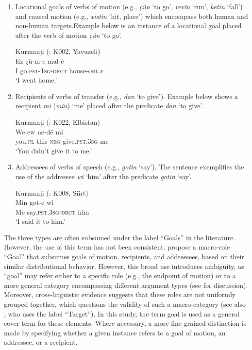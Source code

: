 \largerpage
\begin{enumerate}
    \item Locational goals of verbs of motion (e.g., \textit{çûn} ‘to go’, \textit{revîn} ‘run’, \textit{ketin} ‘fall’) and caused motion (e.g., \textit{xistin} ‘hit, place’) which encompass both human and non-human targets.\newpage Example  below is an instance of a locational goal placed after the verb of motion \textit{çûn} ‘to go’.

\ea%
  \label{ex:key:9} Kurmanji (\citealt{Matras2016}: K002, Yavuzeli)\\
\gll Ez  çû-m-e      mal-ê \\
I     go.\textsc{pst-1sg-drct}  house-\textsc{obl.f}\\
\glt ‘I went home.’
  \z

    \item Recipients of verbs of transfer (e.g., \textit{dan} ‘to give’). Example  below shows a recipient \textit{mi} (\textit{min}) ‘me’ placed after the predicate \textit{dan} ‘to give’.

\ea%
  \label{ex:key:10} Kurmanji (\citealt{Matras2016}: K022, Elbistan)\\
\gll We  ew  ne-dê      mi \\
you\textsc{.pl}  this  \textsc{neg}-give.\textsc{pst.3sg}  me\\
\glt ‘You didn’t give it to me.’
  \z

\item Addressees of verbs of speech (e.g., \textit{gotin} ‘say’). The sentence  exemplifies the use of the addressee \textit{wî} ‘him’ after the predicate \textit{gotin} ‘say’.

\ea%
  \label{ex:key:11} Kurmanji (\citealt{Matras2016}: K008, Siirt)\\
\gll Min  got-e      wî \\
Me  say.\textsc{pst.3sg-drct}      him\\
\glt ‘I said it to him.’ 
  \z
  
\end{enumerate}

The three types are often subsumed under the label “Goals” in the literature. However, the use of this term has not been consistent. \citet{HaigThiele2014} propose a macro-role “Goal” that subsumes goals of motion, recipients, and addressees, based on their similar distributional behavior. However, this broad use introduces ambiguity, as “goal” may refer either to a specific role (e.g., the endpoint of motion) or to a more general category encompassing different argument types (see \citet{HaigEtAl2024} for discussion). Moreover, cross-linguistic evidence suggests that these roles are not uniformly grouped together, which questions the validity of such a macro-category (see also \citet{Asadpour2021}, who uses the label “Target”). In this study, the term goal is used as a general cover term for these elements. Where necessary, a more fine-grained distinction is made by specifying whether a given instance refers to a goal of motion, an addressee, or a recipient.

